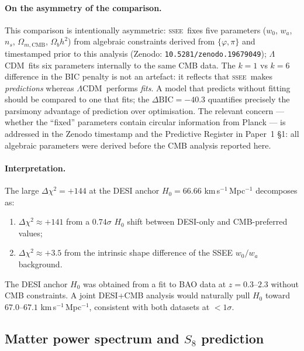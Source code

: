 \documentclass[12pt,a4paper]{article}
\newcommand{\SSEE}{\ifmmode\mathrm{SSEE}\else\textsc{ssee}\fi}
\newcommand{\LCDM}{\ifmmode\Lambda\mathrm{CDM}\else$\Lambda$CDM\fi}
\begin{document}
\paragraph{On the asymmetry of the comparison.}
This comparison is intentionally asymmetric: \SSEE{}xes five parameters
($w_0$, $w_a$, $n_s$, $\Omega_{m,\mathrm{CMB}}$, $\Omega_b h^2$) from algebraic
constraints derived from $\{\varphi,\pi\}$ and timestamped prior to this analysis
(Zenodo: \texttt{10.5281/zenodo.19679049}); \LCDM{}ts six parameters
internally to the same CMB data.  The $k=1$ vs $k=6$ difference in the BIC
penalty is not an artefact: it reflects that \SSEE\ makes \emph{predictions}
whereas \LCDM\ performs \emph{fits}. A model that predicts without fitting
should be compared to one that fits; the $\Delta\mathrm{BIC}=-40.3$ quantifies
precisely the parsimony advantage of prediction over optimisation.
The relevant concern --- whether the ``fixed'' parameters contain circular
information from Planck --- is addressed in the Zenodo timestamp and the
Predictive Register in Paper~1 \S1: all algebraic parameters were derived
before the CMB analysis reported here.

\paragraph{Interpretation.}
The large $\Delta\chi^2=+144$ at the DESI anchor $H_0=66.66$ km\,s$^{-1}$\,Mpc$^{-1}$ decomposes as:
\begin{enumerate}
  \item $\Delta\chi^2\approx+141$ from a $0.74\sigma$ $H_0$ shift between DESI-only and CMB-preferred values;
  \item $\Delta\chi^2\approx+3.5$ from the intrinsic shape difference of the SSEE $w_0/w_a$ background.
\end{enumerate}
The DESI anchor $H_0$ was obtained from a fit to BAO data at $z=0.3$--$2.3$ without CMB constraints. A joint DESI+CMB analysis would naturally pull $H_0$ toward $67.0$--$67.1$ km\,s$^{-1}$\,Mpc$^{-1}$, consistent with both datasets at $<1\sigma$.

\subsection{Matter power spectrum and \texorpdfstring{$S_8$}{S8} prediction}
\label{sec:sigma8}
\end{document}
